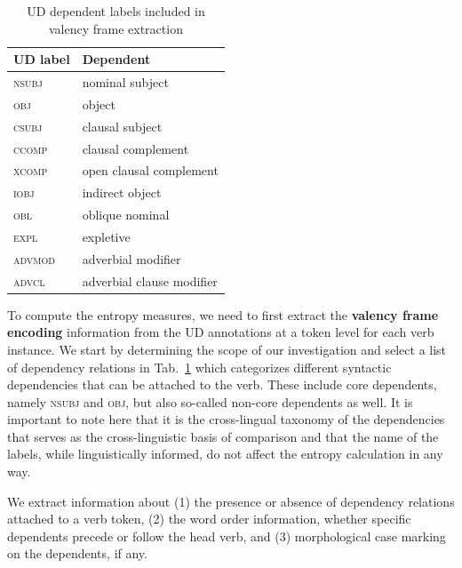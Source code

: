 \begin{table}
  \centering
  \begin{tabular}{ll}
    \toprule
    \textbf{UD label} & \textbf{Dependent} \\
    \midrule
    \textsc{nsubj} & nominal subject \\
    \textsc{obj} & object \\
    \textsc{csubj} & clausal subject \\
    \textsc{ccomp} & clausal complement \\
    \textsc{xcomp}   & open clausal complement \\
    \midrule
    \textsc{iobj} & indirect object \\
    \textsc{obl} & oblique nominal \\
    \textsc{expl} & expletive \\
    \textsc{advmod} & adverbial modifier \\
    \textsc{advcl} & adverbial clause modifier \\
    \bottomrule
  \end{tabular}
  \caption{UD dependent labels included in valency frame extraction}\label{tab:ud-dependent-labels}
\end{table}

To compute the entropy measures, we need to first extract the \textbf{valency frame encoding} information from the UD annotations at a token level for each verb instance. We start by determining the scope of our investigation and select a list of dependency relations in Tab.~\ref{tab:ud-dependent-labels} which categorizes different syntactic dependencies that can be attached to the verb. These include core dependents, namely \textsc{nsubj} and \textsc{obj}, but also so-called non-core dependents as well.  It is important to note here that it is the cross-lingual taxonomy of the dependencies that serves as the cross-linguistic basis of comparison and that the name of the labels, while linguistically informed, do not affect the entropy calculation in any way.

We extract information about (1) the presence or absence of dependency relations attached to a verb token, (2) the word order information, whether specific dependents precede or follow the head verb, and (3) morphological case marking on the dependents, if any.


